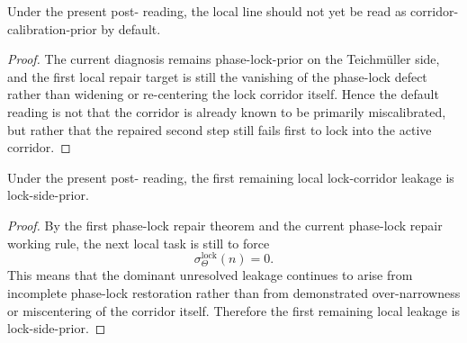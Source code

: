 \begin{proposition}
\label{prop:current-line-is-not-corridor-calibration-prior-by-default}
Under the present post- reading, the local line should not yet be read as corridor-calibration-prior by default.
\end{proposition}

\begin{proof}
The current diagnosis remains phase-lock-prior on the Teichm\"uller side, and the first local repair target is still the vanishing of the phase-lock defect rather than widening or re-centering the lock corridor itself. Hence the default reading is not that the corridor is already known to be primarily miscalibrated, but rather that the repaired second step still fails first to lock into the active corridor.
\end{proof}

\begin{proposition}
\label{prop:current-line-is-lock-side-prior-on-the-leakage-level}
Under the present post- reading, the first remaining local lock-corridor leakage is lock-side-prior.
\end{proposition}

\begin{proof}
By the first phase-lock repair theorem and the current phase-lock repair working rule, the next local task is still to force
\[
 \sigma_{\Theta}^{\mathrm{lock}}(n)=0.
\]
This means that the dominant unresolved leakage continues to arise from incomplete phase-lock restoration rather than from demonstrated over-narrowness or miscentering of the corridor itself. Therefore the first remaining local leakage is lock-side-prior.
\end{proof}

